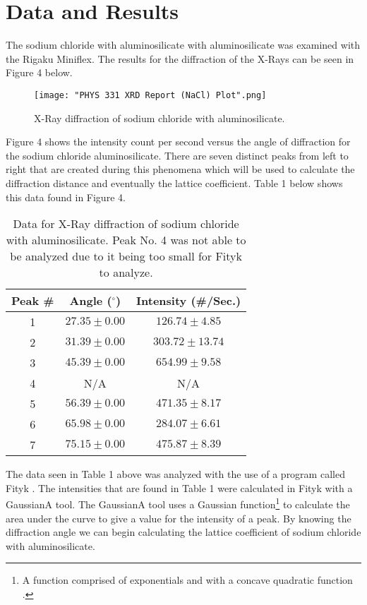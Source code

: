 \documentclass[twocolumn]{article}
\begin{document}
\section*{Data and Results}
The sodium chloride with aluminosilicate with aluminosilicate was examined with the Rigaku Miniflex. The results for the diffraction of the X-Rays can be seen in Figure 4 below.
\begin{figure}[htbp]
\begin{center}
\texttt{[image: "PHYS 331 XRD Report (NaCl) Plot".png]}
\caption{X-Ray diffraction of sodium chloride with aluminosilicate.}
\label{Fig4}
\end{center}
\end{figure}
\newline
Figure 4 shows the intensity count per second versus the angle of diffraction for the sodium chloride aluminosilicate. There are seven distinct peaks from left to right that are created during this phenomena which will be used to calculate the diffraction distance and eventually the lattice coefficient. Table 1 below shows this data found in Figure 4.
\begin{table}[htp]
\begin{center}
\begin{tabular}{|c|c|c|}
	\hline \textbf{Peak \#} & \textbf{Angle ($^{\circ}$)} & \textbf{Intensity (\#/Sec.)} \\ \hline
	1 & $27.35\pm0.00$ & $126.74\pm4.85$ \\ \hline
	2 & $31.39\pm0.00$ & $303.72\pm13.74$ \\ \hline
	3 & $45.39\pm0.00$ & $654.99\pm9.58$ \\ \hline
	4 & N/A & N/A \\ \hline
	5 & $56.39\pm0.00$ & $471.35\pm8.17$ \\ \hline
	6 & $65.98\pm0.00$ & $284.07\pm6.61$ \\ \hline
	7 & $75.15\pm0.00$ & $475.87\pm8.39$ \\ \hline 
\end{tabular}
\caption{Data for X-Ray diffraction of sodium chloride with aluminosilicate. Peak No. 4 was not able to be analyzed due to it being too small for Fityk to analyze.}
\end{center}
\label{default}
\end{table}%
\newline
The data seen in Table 1 above was analyzed with the use of a program called Fityk \cite{Fityk}. The intensities that are found in Table 1 were calculated in Fityk with a GaussianA tool. The GaussianA tool uses a Gaussian function\footnote{A function comprised of exponentials and with a concave quadratic function \cite{WikiGauss}.} to calculate the area under the curve to give a value for the intensity of a peak. By knowing the diffraction angle we can begin calculating the lattice coefficient of sodium chloride with aluminosilicate.
\end{document}
